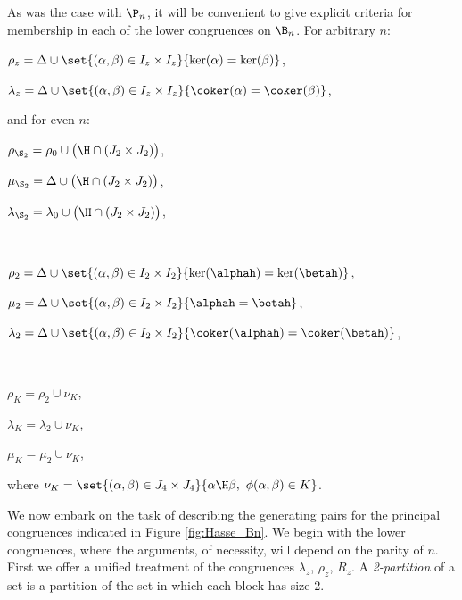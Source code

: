As was the case with $\P_n$, it will be convenient to give explicit criteria for membership in each of the lower congruences on $\B_n$.  For arbitrary $n$:
\begin{itemize}\begin{multicols}{2}
\item $\rho_z=\Delta \cup \set{(\alpha,\beta)\in I_z\times I_z}{\ker(\alpha)=\ker(\beta)}$,

\item $\lambda_z=\Delta \cup \set{(\alpha,\beta)\in I_z\times I_z}{\coker(\alpha)=\coker(\beta)}$,
\end{multicols}\end{itemize}
and for even $n$:
\begin{itemize}
\begin{multicols}{2}
\item $\rho_{\S_2}=\rho_0\cup\big( {\H}\cap(J_2\times J_2)\big)$,
\item $\mu_{\S_2}=\Delta\cup\big( {\H}\cap(J_2\times J_2)\big)$,
\item $\lambda_{\S_2}=\lambda_0\cup\big( {\H}\cap(J_2\times J_2)\big)$,
\item[] ~
\end{multicols}
\begin{multicols}{2}
\item $\rho_2=\Delta\cup\set{(\alpha,\beta)\in I_2\times I_2}{\ker(\alphah)=\ker(\betah)}$,
\item $\mu_2=\Delta\cup\set{(\alpha,\beta)\in I_2\times I_2}{\alphah=\betah}$,
\item $\lambda_2=\Delta\cup\set{(\alpha,\beta)\in I_2\times I_2}{\coker(\alphah)=\coker(\betah)}$,
\item[] ~
\end{multicols}
\begin{multicols}{3}
\item $\rho_K=\rho_2\cup\nu_K$,
\item $\lambda_K=\lambda_2\cup\nu_K$,
\item $\mu_K=\mu_2\cup\nu_K$,
\end{multicols}
\end{itemize}
where $\nu_K=\set{(\alpha,\beta)\in J_4\times J_4}{\alpha\H\beta,\ \phi(\alpha,\beta)\in K}$.

We now embark on the task of describing the generating pairs for the principal congruences indicated in Figure \ref{fig:Hasse_Bn}.
We begin with the lower congruences, where the arguments, of necessity, will depend on the parity of $n$. First we offer a unified treatment of the congruences $\lambda_z$, $\rho_z$, $R_z$.  A \emph{2-partition} of a set is a partition of the set in which each block has size 2.


